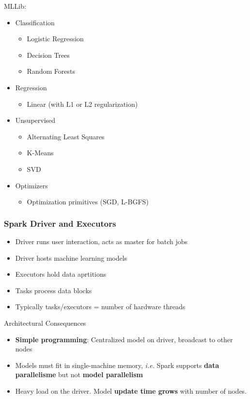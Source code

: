 MLLib:
\begin{itemize}
 \item Classification
 \begin{itemize}
  \item Logistic Regression
  \item Decision Trees
  \item Random Forests
 \end{itemize}
 \item Regression
 \begin{itemize}
  \item Linear (with L1 or L2 regularization)
 \end{itemize}
 \item Unsupervised
 \begin{itemize}
  \item Alternating Least Squares
  \item K-Means
  \item SVD
 \end{itemize}
 \item Optimizers
 \begin{itemize}
  \item Optimization primitives (SGD, L-BGFS)
 \end{itemize}
\end{itemize}

\subsubsection{Spark Driver and Executors}

\begin{itemize}
 \item Driver runs user interaction, acts as master for batch jobs
 \item Driver hosts machine learning models
 \item Executors hold data aprtitions
 \item Tasks process data blocks
 \item Typically tasks/executors = number of hardware threads
\end{itemize}

Architectural Consequences
\begin{itemize}
 \item {\bf Simple programming}: Centralized model on driver, broadcast to other nodes
 \item Models must fit in single-machine memory, \emph{i.e.} Spark supports {\bf data parallelisme} but not {\bf model parallelism}
 \item Heavy load on the driver. Model {\bf update time grows} with number of nodes.
\end{itemize}

